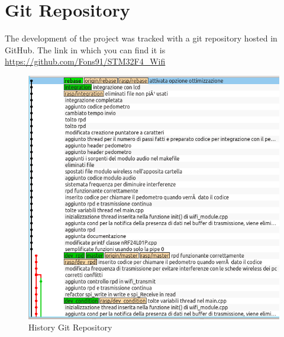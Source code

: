 \documentclass[11pt,a4paper,oneside]{article}
\begin{document}
\section{Git Repository}
The development of the project was tracked with a git repository hosted in GitHub. The link in which you can find it is \url{https://github.com/Fons91/STM32F4_Wifi}
\begin{figure}[H]
\centering
\includegraphics[scale=0.5]{./Immagini/gitRepo.png}
\caption{History Git Repository}
\label{History Git Repository}
\end{figure}
\newpage
\end{document}
